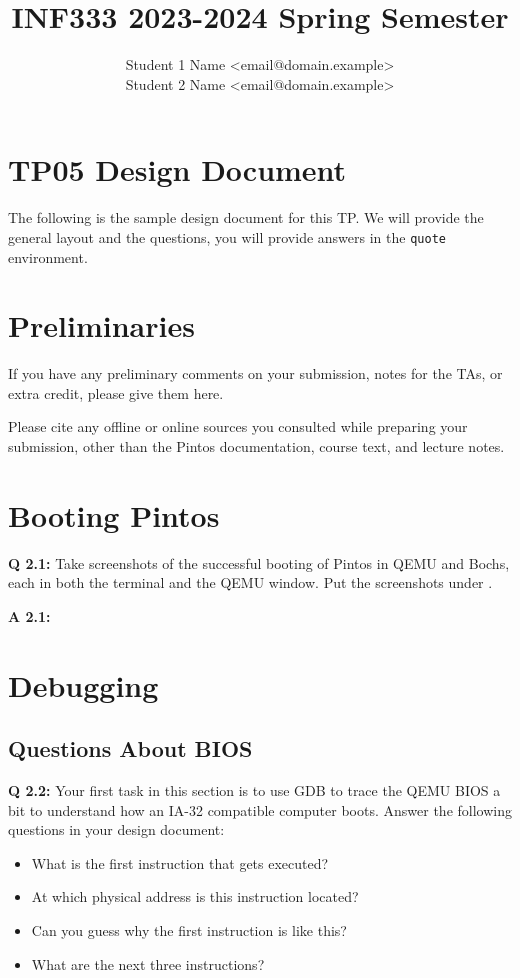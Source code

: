 \documentclass[a4paper,11pt]{paper}
\title{INF333 2023-2024 Spring Semester}
\author{Student 1 Name <email@domain.example>
\\ Student 2 Name <email@domain.example>}
\begin{document}
\maketitle

\section*{\LARGE TP05 Design Document}

The following is the sample design document for this TP. We will provide the general layout and the questions, you will provide answers in the \texttt{quote} environment.


\section{Preliminaries}

If you have any preliminary comments on your submission, notes for the TAs, or extra credit, please give them here.

Please cite any offline or online sources you consulted while preparing your
submission, other than the Pintos documentation, course text, and lecture notes.


\section{Booting Pintos}


\textbf{Q 2.1:} Take screenshots of the successful booting of Pintos in QEMU and Bochs, each in
both the terminal and the QEMU window. Put the screenshots under
.

\textbf{A 2.1:}

\section{Debugging}

\subsection{Questions About BIOS}


\textbf{Q 2.2:} Your first task in this section is to use GDB to trace the QEMU BIOS a bit to understand how an IA-32 compatible computer boots. Answer the following questions in your design document: 
\begin{itemize}
    \item What is the first instruction that gets executed? 
    \item At which physical address is this instruction located? 
    \item Can you guess why the first instruction is like this?
    \item What are the next three instructions?
\end{itemize}
\end{document}
